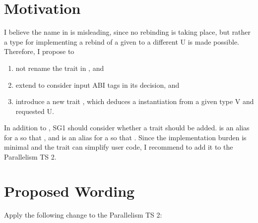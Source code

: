 \section{Motivation}
I believe the name  in \textcite{P0820R1} is misleading, since no rebinding is taking place, but rather a type for implementing a rebind of a given \simd[<T, Abi>] to a different  \type U is made possible.
Therefore, I propose to
\begin{enumerate}
  \item not rename the  trait in \textcite{P0214R8}, and
  \item extend  to consider input ABI tags in its decision, and
  \item introduce a new trait , which deduces a \simd[<U, Abi>] instantiation from a given \simd type \type V and requested  \type U.
\end{enumerate}

In addition to , SG1 should consider whether a  trait should be added.
 is an alias for a \simd[<T, Abi1>] so that , and
 is an alias for a \mask[<T, Abi1>] so that .
Since the implementation burden is minimal and the trait can simplify user code, I recommend to add it to the Parallelism TS 2.

\section{Proposed Wording}

Apply the following change to the Parallelism TS 2:
\begin{wgText}
  \begingroup
    \ttfamily\smaller[1]
    \\
    \\
    \\
    \\
  \endgroup
\end{wgText}

